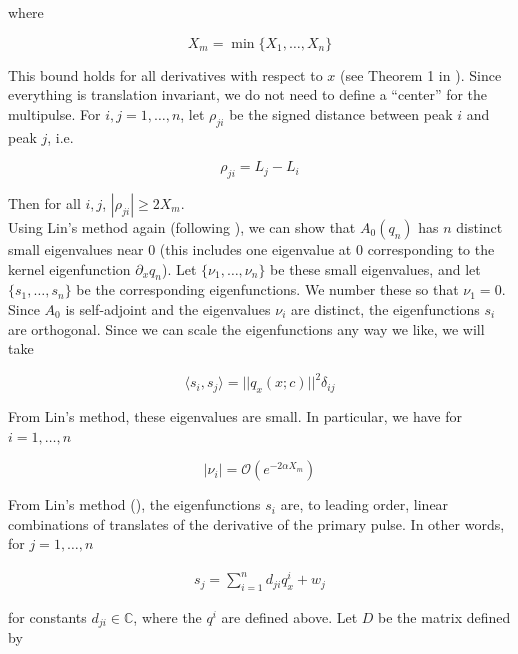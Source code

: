 \documentclass[12pt]{article}
\def\C{{\mathbb C}}
\begin{document}
where

\begin{equation}\label{defXm}
X_m = \min\{X_1, \dots, X_n \}
\end{equation}

This bound holds for all derivatives with respect to $x$ (see Theorem 1 in \cite{Sandstede1998}). Since everything is translation invariant, we do not need to define a ``center'' for the multipulse. For $i, j = 1, \dots, n$, let $\rho_{ji}$ be the signed distance between peak $i$ and peak $j$, i.e. 

\begin{equation}\label{rhoji}
\rho_{ji} = L_j - L_i
\end{equation}

Then for all $i, j$, $|\rho_{ji}| \geq 2 X_m$.\\

Using Lin's method again (following \cite{Sandstede1998}), we can show that $A_0(q_n)$ has $n$ distinct small eigenvalues near 0 (this includes one eigenvalue at 0 corresponding to the kernel eigenfunction $\partial_x q_n$). Let $\{\nu_1, \dots, \nu_n\}$ be these small eigenvalues, and let $\{s_1, \dots, s_n \}$ be the corresponding eigenfunctions. We number these so that $\nu_1 = 0$. Since $A_0$ is self-adjoint and the eigenvalues $\nu_i$ are distinct, the eigenfunctions $s_i$ are orthogonal. Since we can scale the eigenfunctions any way we like, we will take

\begin{equation}\label{orthonormaleigs}
\langle s_i, s_j \rangle = ||q_x(x; c)||^2 \delta_{ij}
\end{equation}

From Lin's method, these eigenvalues are small. In particular, we have for $i = 1, \dots, n$

\begin{equation}
|\nu_i| = \mathcal{O}(e^{-2 \alpha X_m})
\end{equation}

From Lin's method (\cite{Sandstede1998}), the eigenfunctions $s_i$ are, to leading order, linear combinations of translates of the derivative of the primary pulse. In other words, for $j = 1, \dots, n$

\begin{align}\label{sj}
s_j = \sum_{i = 1}^{n} d_{ji} q^i_x + w_j
\end{align}

for constants $d_{ji} \in \C$, where the $q^i$ are defined above. Let $D$ be the matrix defined by 
\end{document}
